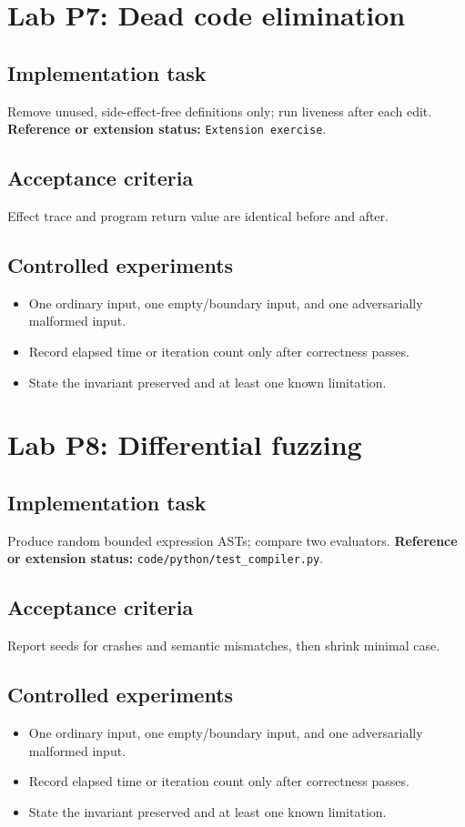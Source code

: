 \documentclass[10pt,letterpaper]{article}
\begin{document}
\section{Lab P7: Dead code elimination}
\subsection{Implementation task}
Remove unused, side-effect-free definitions only; run liveness after each edit.
\textbf{Reference or extension status:} \texttt{Extension exercise}.\par\subsection{Acceptance criteria}
Effect trace and program return value are identical before and after.
\subsection{Controlled experiments}
\begin{itemize}
\item One ordinary input, one empty/boundary input, and one adversarially malformed input.
\item Record elapsed time or iteration count only after correctness passes.
\item State the invariant preserved and at least one known limitation.
\end{itemize}


\section{Lab P8: Differential fuzzing}
\subsection{Implementation task}
Produce random bounded expression ASTs; compare two evaluators.
\textbf{Reference or extension status:} \nolinkurl{code/python/test_compiler.py}.\par\subsection{Acceptance criteria}
Report seeds for crashes and semantic mismatches, then shrink minimal case.
\subsection{Controlled experiments}
\begin{itemize}
\item One ordinary input, one empty/boundary input, and one adversarially malformed input.
\item Record elapsed time or iteration count only after correctness passes.
\item State the invariant preserved and at least one known limitation.
\end{itemize}
\end{document}
